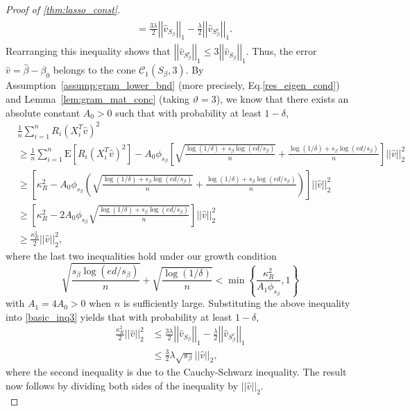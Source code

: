 \documentclass[ejsv2,noshowframe]{imsart}
\theoremstyle{plain}
\theoremstyle{definition}
\theoremstyle{remark}
\newcommand{\norm}[1]{\left|\left| #1 \right|\right|}
\renewcommand{\hat}{\widehat}
\begin{document}
\begin{proof}[Proof of \autoref{thm:lasso_const}]
\begin{align}
\begin{split}
			&= \frac{3\lambda}{2} \norm{\hat{v}_{S_{\beta}}}_1 - \frac{\lambda}{2} \norm{\hat{v}_{S_{\beta}^c}}_1.
		\end{split}
	\end{align}
	Rearranging this inequality shows that $\norm{\hat{v}_{S_{\beta}^c}}_1 \leq 3\norm{\hat{v}_{S_{\beta}}}_1$. Thus, the error $\hat{v} =\hat{\beta} -\beta_0$ belongs to the cone $\mathcal{C}_1(S_{\beta},3)$. By Assumption~\ref{assump:gram_lower_bnd} (more precisely, Eq.\eqref{res_eigen_cond}) and Lemma~\ref{lem:gram_mat_conc} (taking $\vartheta=3$), we know that there exists an absolute constant $A_0>0$ such that with probability at least $1-\delta$,
	\begin{align*}
		&\frac{1}{n} \sum_{i=1}^n R_i \left(X_i^T \hat{v} \right)^2\\
		&\geq \frac{1}{n}\sum_{i=1}^n \mathrm{E}\left[R_i\left(X_i^T\hat{v}\right)^2 \right]- A_0 \phi_{s_{\beta}} \left[\sqrt{\frac{\log(1/\delta) + s_{\beta}\log(ed/s_{\beta})}{n}} + \frac{\log(1/\delta)  + s_{\beta}\log(ed/s_{\beta})}{n} \right] \norm{\hat{v}}_2^2\\
		&\geq \left[\kappa_R^2 - A_0\phi_{s_{\beta}} \left(\sqrt{\frac{\log(1/\delta) + s_{\beta}\log(ed/s_{\beta})}{n}} + \frac{\log(1/\delta) + s_{\beta}\log(ed/s_{\beta})}{n} \right) \right] \norm{\hat{v}}_2^2\\
		&\geq \left[\kappa_R^2 - 2A_0\phi_{s_{\beta}} \sqrt{\frac{\log(1/\delta) + s_{\beta}\log(ed/s_{\beta})}{n}} \right] \norm{\hat{v}}_2^2\\
		&\geq \frac{\kappa_R^2}{2} \norm{\hat{v}}_2^2,
	\end{align*} 
	where the last two inequalities hold under our growth condition 
	$$\sqrt{\frac{s_{\beta}\log(ed/s_{\beta})}{n}} + \sqrt{\frac{\log(1/\delta)}{n}} < \min\left\{\frac{\kappa_R^2}{A_1 \phi_{s_{\beta}}}, 1 \right\}$$
	with $A_1=4A_0 >0$ when $n$ is sufficiently large. Substituting the above inequality into \eqref{basic_inq3} yields that with probability at least $1-\delta$,
	\begin{align*}
		\frac{\kappa_R^2}{2}\norm{\hat{v}}_2^2 &\leq\frac{3\lambda}{2} \norm{\hat{v}_{S_{\beta}}}_1 - \frac{\lambda}{2} \norm{\hat{v}_{S_{\beta}^c}}_1 \\
		&\leq \frac{3}{2} \lambda \sqrt{s_{\beta}} \norm{\hat{v}}_2,
	\end{align*}
	where the second inequality is due to the Cauchy-Schwarz inequality. The result now follows by dividing both sides of the inequality by $\norm{\hat{v}}_2$.\\
	

\end{proof}
\end{document}
